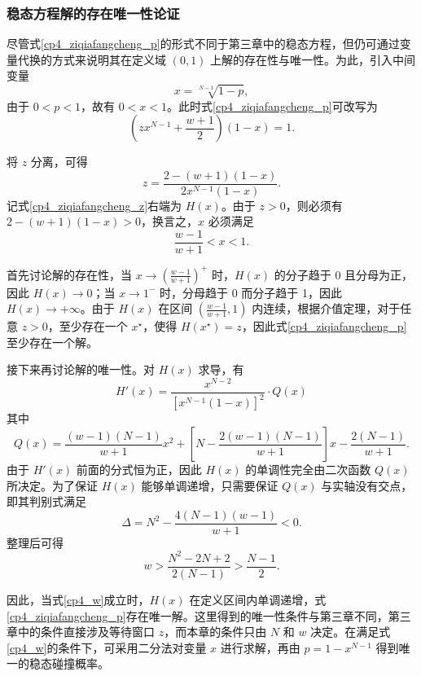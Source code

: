 \subsubsection{稳态方程解的存在唯一性论证}

尽管式\eqref{cp4_ziqiafangcheng_p}的形式不同于第三章中的稳态方程，但仍可通过变量代换的方式来说明其在定义域 $(0,1)$ 上解的存在性与唯一性。为此，引入中间变量
\[
x=\sqrt[N-1]{1-p},
\]
由于 $0<p<1$，故有 $0<x<1$。此时式\eqref{cp4_ziqiafangcheng_p}可改写为
\begin{equation}\label{cp4_ziqiafangcheng_x}
    \left(zx^{N-1}+\frac{w+1}{2}\right)(1-x)=1.
\end{equation}

将 $z$ 分离，可得
\begin{equation}\label{cp4_ziqiafangcheng_z}
    z=\frac{2-(w+1)(1-x)}{2x^{N-1}(1-x)}.
\end{equation}
记式\eqref{cp4_ziqiafangcheng_z}右端为 $H(x)$。由于 $z>0$，则必须有 $2-(w+1)(1-x)>0$，换言之，$x$ 必须满足
\[
\frac{w-1}{w+1}<x<1.
\]

首先讨论解的存在性，当 $x\to \left(\frac{w-1}{w+1}\right)^+$ 时，$H(x)$ 的分子趋于 0 且分母为正，因此 $H(x)\to 0$；当 $x\to 1^-$ 时，分母趋于 0 而分子趋于 1，因此 $H(x)\to +\infty$。由于 $H(x)$ 在区间 $\left(\frac{w-1}{w+1},1\right)$ 内连续，根据介值定理，对于任意 $z>0$，至少存在一个 $x^\star$，使得 $H(x^\star)=z$，因此式\eqref{cp4_ziqiafangcheng_p}至少存在一个解。

接下来再讨论解的唯一性。对 $H(x)$ 求导，有
\begin{equation}
    H'(x) = \frac{x^{N-2}}{\left[x^{N-1}(1-x)\right]^2} \cdot Q(x)
\end{equation}
其中
\begin{equation}
    Q(x) = \frac{(w-1)(N-1)}{w+1}x^2 + \left[N - \frac{2(w-1)(N-1)}{w+1}\right]x - \frac{2(N-1)}{w+1}.
\end{equation}
由于 $H'(x)$ 前面的分式恒为正，因此 $H(x)$ 的单调性完全由二次函数 $Q(x)$ 所决定。为了保证 $H(x)$ 能够单调递增，只需要保证 $Q(x)$ 与实轴没有交点，即其判别式满足
\begin{equation}
    \Delta = N^2 - \frac{4(N-1)(w-1)}{w+1}<0.
\end{equation}
整理后可得
\begin{equation}\label{cp4_w}
    w>\frac{N^2-2N+2}{2(N-1)}>\frac{N-1}{2}.
\end{equation}

因此，当式\eqref{cp4_w}成立时，$H(x)$ 在定义区间内单调递增，式\eqref{cp4_ziqiafangcheng_p}存在唯一解。这里得到的唯一性条件与第三章不同，第三章中的条件直接涉及等待窗口 $z$，而本章的条件只由 $N$ 和 $w$ 决定。在满足式\eqref{cp4_w}的条件下，可采用二分法对变量 $x$ 进行求解，再由 $p=1-x^{N-1}$ 得到唯一的稳态碰撞概率。

